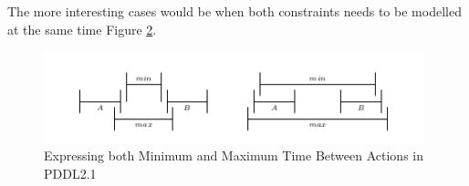 \documentclass
[a4paper
,english
,parskip=half
,bibliography=totoc
]{scrreprt}
\begin{document}
        \begin{figure}[h]
                \hfill
                \vfill
                \centering 
                \caption{}
                \label{fig:minimum_compact}
        \label{fig:minimum}
        \end{figure}


        The more interesting cases would be when both constraints needs to be modelled at the same time Figure \ref{fig:maxandmin}. 

        \begin{figure}[!]
            \centering    
            \includegraphics[width=11cm]{max_min.png}
            \caption{Expressing both Minimum and Maximum Time Between Actions in PDDL2.1}
             \label{fig:maxandmin}
        \end{figure}
\end{document}

